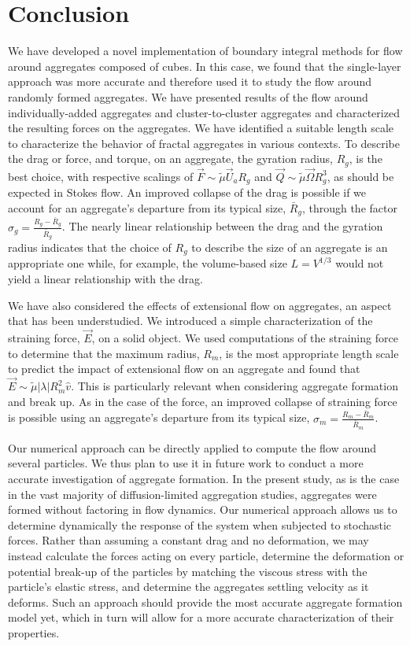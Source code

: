 \section{Conclusion}
\label{sec:conclusion}

We have developed a novel implementation of boundary integral methods for flow around aggregates composed of cubes. In this case, we found that the single-layer approach was more accurate and therefore used it to study the flow around randomly formed aggregates.
We have presented results of the flow around individually-added aggregates and cluster-to-cluster aggregates  and  characterized the resulting forces on the aggregates. We have identified a suitable length scale to characterize the behavior of fractal aggregates in various contexts. To describe the drag or force, and  torque, on an aggregate, the gyration radius, $R_g$, is the best choice, with respective scalings of $\vec{F} \sim \tilde{\mu} \vec{U}_a R_g$ and $\vec{Q} \sim \tilde{\mu} \vec{\Omega} R_g^3$, as should be expected in Stokes flow. 
An improved collapse of the drag is possible if we account for an aggregate's departure from its typical size, $\bar{R}_g$, through the factor $\sigma_g = \frac{R_g - \bar{R}_g}{\bar{R}_g}$. 
The nearly linear relationship between the drag and the gyration radius indicates that the choice of $R_g$ to describe the size of an aggregate is an appropriate one while, for example, the volume-based size $L=V^{1/3}$ would not yield a linear relationship with the drag.  



We have also considered the effects of extensional flow on aggregates, an aspect that has been understudied. We introduced a simple characterization of the straining force, $\vec{E}$, on a solid object. We used computations of the straining force to determine that the maximum radius, $R_m$, is the most appropriate length scale to predict the impact of extensional flow on an aggregate and found that $\vec{E} \sim \tilde{\mu} |\lambda| R_m^2 \hat{v}$. This is particularly relevant when considering aggregate formation and break up. As in the case of the force, an improved collapse
of straining force is 
possible using an aggregate's departure from its typical size, $\sigma_m = \frac{R_m - \bar{R}_m}{\bar{R}_m}$. 


Our numerical approach can be directly applied to compute the flow around several particles. We thus plan to use it in future work to conduct a more accurate investigation of aggregate formation. In the present study, as is the case in the vast majority of diffusion-limited aggregation studies, aggregates were formed without factoring in flow dynamics. Our numerical approach allows us to determine dynamically the response of the system when subjected to stochastic forces. Rather than assuming a constant drag and no deformation, we may instead calculate the forces acting on every particle, determine the deformation or potential break-up of the particles by matching the viscous stress with the particle's elastic stress, and determine the aggregates settling velocity as it deforms. Such an approach should provide the most accurate aggregate formation model yet, which in turn will allow for a more accurate characterization of their properties.

